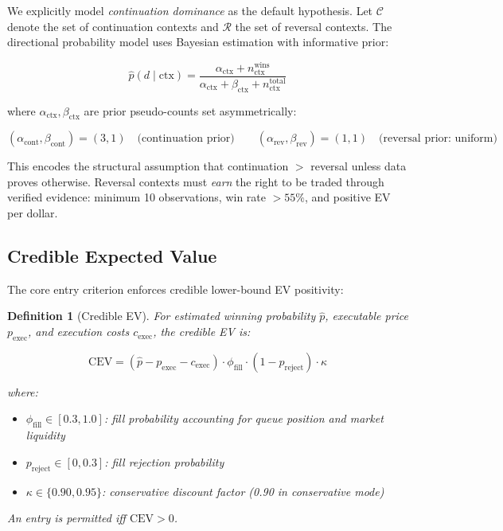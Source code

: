 \documentclass[11pt,a4paper]{article}
\newtheorem{definition}{Definition}[section]
\begin{document}
We explicitly model \emph{continuation dominance} as the default hypothesis. Let $\mathcal{C}$ denote the set of continuation contexts and $\mathcal{R}$ the set of reversal contexts. The directional probability model uses Bayesian estimation with informative prior:

\begin{equation}\label{eq:directional_bayes}
    \hat{p}(d \mid \text{ctx}) = \frac{\alpha_{\text{ctx}} + n_{\text{ctx}}^{\text{wins}}}{\alpha_{\text{ctx}} + \beta_{\text{ctx}} + n_{\text{ctx}}^{\text{total}}}
\end{equation}

\noindent where $\alpha_{\text{ctx}}, \beta_{\text{ctx}}$ are prior pseudo-counts set asymmetrically:

\begin{equation}\label{eq:continuation_prior}
    (\alpha_{\text{cont}}, \beta_{\text{cont}}) = (3, 1) \quad \text{(continuation prior)}
    \qquad
    (\alpha_{\text{rev}}, \beta_{\text{rev}}) = (1, 1) \quad \text{(reversal prior: uniform)}
\end{equation}

This encodes the structural assumption that continuation $>$ reversal unless data proves otherwise. Reversal contexts must \emph{earn} the right to be traded through verified evidence: minimum 10 observations, win rate $> 55\%$, and positive EV per dollar.

\subsection{Credible Expected Value}\label{sec:credible_ev}

The core entry criterion enforces credible lower-bound EV positivity:

\begin{definition}[Credible EV]
For estimated winning probability $\hat{p}$, executable price $p_{\text{exec}}$, and execution costs $c_{\text{exec}}$, the \emph{credible EV} is:

\begin{equation}\label{eq:credible_ev}
    \text{CEV} = (\hat{p} - p_{\text{exec}} - c_{\text{exec}}) \cdot \phi_{\text{fill}} \cdot (1 - p_{\text{reject}}) \cdot \kappa
\end{equation}

\noindent where:
\begin{itemize}
    \item $\phi_{\text{fill}} \in [0.3, 1.0]$: fill probability accounting for queue position and market liquidity
    \item $p_{\text{reject}} \in [0, 0.3]$: fill rejection probability
    \item $\kappa \in \{0.90, 0.95\}$: conservative discount factor (0.90 in conservative mode)
\end{itemize}

An entry is permitted iff $\text{CEV} > 0$.
\end{definition}
\end{document}
